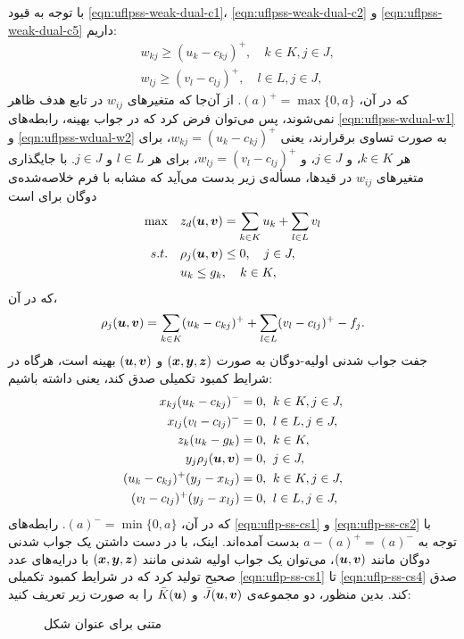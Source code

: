 با توجه به قیود \eqref{eqn:uflpss-weak-dual-c1}، \eqref{eqn:uflpss-weak-dual-c2} و \eqref{eqn:uflpss-weak-dual-c5} داریم:
\begin{align}
& w_{kj} \geq (u_k-c_{kj})^+, \quad k\in K, j\in J, \label{eqn:uflpss-wdual-w1}\\
& w_{lj} \geq (v_l-c_{lj})^+, \quad l\in L, j\in J, \label{eqn:uflpss-wdual-w2}
\end{align}
که در آن، $(a)^+=\max\{0,a\}$. از آن‌جا که متغیرهای $w_{ij}$ در تابع هدف ظاهر نمی‌شوند، پس می‌توان فرض کرد  که در جواب بهینه، رابطه‌های \eqref{eqn:uflpss-wdual-w1} و \eqref{eqn:uflpss-wdual-w2} به صورت تساوی برقرارند، یعنی $w_{kj} = (u_k-c_{kj})^+$، برای هر $k\in K$، و $j\in J$، و $w_{lj} = (v_l-c_{lj})^+$، برای هر $l\in L$ و $j\in J$. با جایگذاری متغیرهای $w_{ij}$ در قید‌ها، مسأله‌ی زیر بدست می‌آید که مشابه با فرم خلاصه‌شده‌ی دوگان برای  است
 \begin{align}
 \max  \quad   &  z_d({\boldsymbol u},{\boldsymbol v}) = \sum_{k\in K} u_k + \sum_{l\in L} v_l  \label{eqn:uflpss-con-wdual-obj} \\
 s. t. \quad     &   \rho_j({\boldsymbol u},{\boldsymbol v})\leq 0,        \quad j\in J,  \label{eqn:uflpss-con-wdual-c1}\\
               &   u_k \leq g_k,                      \quad k\in K, \label{eqn:uflpss-con-wdual-c2}
 \end{align}
 که در آن،
 \begin{align*}
 \rho_j({\boldsymbol u},{\boldsymbol v}) = \sum_{k\in K} (u_k-c_{kj})^+ +  \sum_{l\in L} (v_l-c_{lj})^+ - f_j.
 \end{align*}
 جفت جواب شدنی اولیه-دوگان به صورت $({\boldsymbol x},{\boldsymbol y},{\boldsymbol z})$  و $({\boldsymbol u},{\boldsymbol v})$ بهینه است، هرگاه در شرایط کمبود تکمیلی صدق کند، یعنی داشته باشیم:
\begin{align}
 x_{kj} ( u_k - c_{kj} )^- = 0, \; &\; k\in K, j\in J,                     \label{eqn:uflp-ss-cs1}\\
 x_{lj} ( v_l - c_{lj} )^- = 0, \; & \;l\in L, j\in J,                    \label{eqn:uflp-ss-cs2}\\
 z_k (u_k - g_k) = 0, \; & \;k\in K,                            \label{eqn:uflp-ss-cs3}\\
 y_j \rho_j({\boldsymbol u},{\boldsymbol v})  = 0, \; & \;j\in J,                                    \label{eqn:uflp-ss-cs4}\\
 ( u_k - c_{kj} )^+( y_j - x_{kj} ) =0, \; & \;k\in K, j\in J,  \label{eqn:uflp-ss-cs5}\\
 ( v_l - c_{lj} )^+( y_j - x_{lj} ) =0, \; & \;l\in L, j\in J,  \label{eqn:uflp-ss-cs6}
\end{align}
که در آن، $(a)^-=\min\{0,a\}$. رابطه‌های \eqref{eqn:uflp-ss-cs1} و \eqref{eqn:uflp-ss-cs2} با توجه به   $a-(a)^+=(a)^-$ بدست آمده‌اند. اینک، با در دست داشتن یک جواب شدنی دوگان مانند $({\boldsymbol u},{\boldsymbol v})$، می‌توان یک جواب اولیه شدنی مانند $({\boldsymbol x},{\boldsymbol y},{\boldsymbol z})$  با درایه‌های  عدد صحیح تولید کرد که در شرایط کمبود تکمیلی \eqref{eqn:uflp-ss-cs1} تا \eqref{eqn:uflp-ss-cs4} صدق کند.  بدین منظور، دو مجموعه‌ی $\bar J({\boldsymbol u},{\boldsymbol v})$ و $\bar K({\boldsymbol u})$ را به صورت زیر تعریف کنید: 

\begin{figure}[t]

\caption{متنی برای عنوان شکل}
\end{figure}
